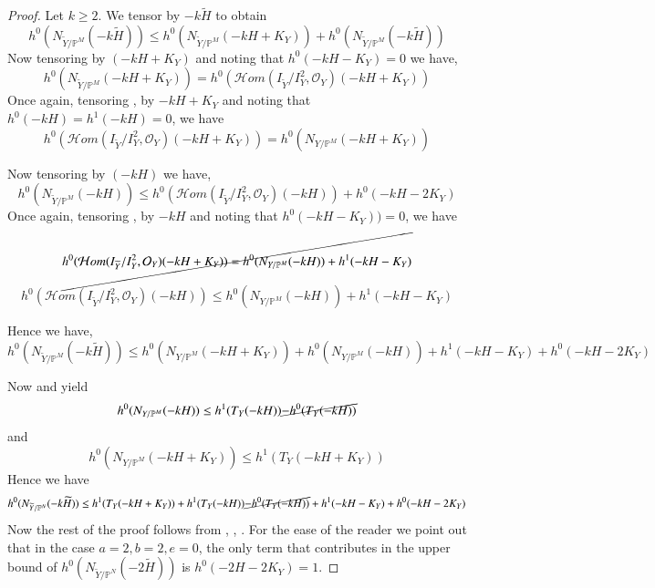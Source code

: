 \documentclass[11pt,twoside]{amsart}
\theoremstyle{plain}
\numberwithin{equation}{section}
\theoremstyle{definition}
\begin{document}
\begin{proof}
   Let $k \geq 2$. We tensor  by $-k\widetilde{H}$ to obtain
    $$h^0(N_{\widetilde{Y}/\mathbb{P}^M}(-k\widetilde{H})) \leq  h^0(N_{\widetilde{Y}/\mathbb{P}^M}(-kH+K_Y)) + h^0(N_{\widetilde{Y}/\mathbb{P}^M}(-k\widetilde{H}))$$
    Now tensoring  by $(-kH+K_Y)$ and noting that $h^0(-kH-K_Y) = 0$ we have,
    $$h^0(N_{\widetilde{Y}/\mathbb{P}^M}(-kH+K_Y)) = h^0(\mathcal{H}om(I_{\widetilde{Y}}/I_{Y}^2, \mathcal{O}_Y)(-kH+K_Y))$$
    Once again, tensoring , by $-kH+K_Y$ and noting that $h^0(-kH) = h^1(-kH) = 0$, we have 
    $$h^0(\mathcal{H}om(I_{\widetilde{Y}}/I_{Y}^2, \mathcal{O}_Y)(-kH+K_Y)) = h^0(N_{Y/\mathbb{P}^M}(-kH+K_Y))$$

    
    Now tensoring  by $(-kH)$ we have,
    $$h^0(N_{\widetilde{Y}/\mathbb{P}^M}(-kH)) \leq h^0(\mathcal{H}om(I_{\widetilde{Y}}/I_{Y}^2, \mathcal{O}_Y)(-kH))+h^0(-kH-2K_Y)$$
    Once again, tensoring , by $-kH$ and noting that $h^0(-kH-K_Y)) = 0$, we have 
    $$\cancel{h^0(\mathcal{H}om(I_{\widetilde{Y}}/I_{Y}^2, \mathcal{O}_Y)(-kH+K_Y)) = h^0(N_{Y/\mathbb{P}^M}(-kH))+h^1(-kH-K_Y)}$$

\color{blue}
    $$h^0(\mathcal{H}om(I_{\widetilde{Y}}/I_{Y}^2, \mathcal{O}_Y)(-kH)) \leq h^0(N_{Y/\mathbb{P}^M}(-kH))+h^1(-kH-K_Y)$$

\color{black}
    Hence we have,
    $$h^0(N_{\widetilde{Y}/\mathbb{P}^M}(-k\widetilde{H})) \leq  h^0(N_{Y/\mathbb{P}^M}(-kH+K_Y)) + h^0(N_{Y/\mathbb{P}^M}(-kH)) +  h^1(-kH-K_Y) + h^0(-kH-2K_Y)$$

Now  and  yield %
$$h^0(N_{Y/\mathbb{P}^M}(-kH)) \leq h^1(T_Y(-kH)) \cancel{- h^0(T_Y(-kH))}$$
and
$$h^0(N_{Y/\mathbb{P}^M}(-kH+K_Y)) \leq h^1(T_Y(-kH+K_Y))$$
Hence we have 
$$h^0(N_{\widetilde{Y}/\mathbb{P}^N}(-k\widetilde{H})) \leq h^1(T_Y(-kH+K_Y)) + h^1(T_Y(-kH)) \cancel{- h^0(T_Y(-kH))} +  h^1(-kH-K_Y) + h^0(-kH-2K_Y) $$
Now the rest of the proof follows from , , . For the ease of the reader we point out that in the case $a = 2, b = 2, e = 0$, the only term that contributes in the upper bound of $h^0(N_{\widetilde{Y}/\mathbb{P}^N}(-2\widetilde{H}))$ is $h^0(-2H-2K_Y) = 1$. 
\end{proof}
\end{document}
